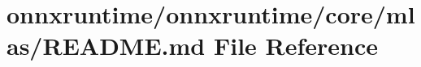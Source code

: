 \hypertarget{onnxruntime_2core_2mlas_2README_8md}{}\section{onnxruntime/onnxruntime/core/mlas/\+R\+E\+A\+D\+ME.md File Reference}
\label{onnxruntime_2core_2mlas_2README_8md}
